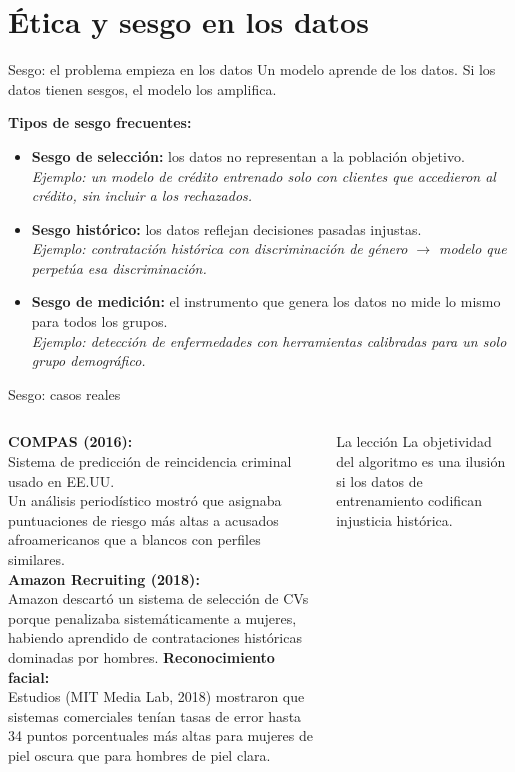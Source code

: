 \documentclass[aspectratio=169]{beamer}
\begin{document}
\section{Ética y sesgo en los datos}

\begin{frame}{Sesgo: el problema empieza en los datos}
  Un modelo aprende de los datos. Si los datos tienen sesgos, el modelo los amplifica.

  \bigskip
  \textbf{Tipos de sesgo frecuentes:}
  \begin{itemize}
    \item \textbf{Sesgo de selección:} los datos no representan a la población objetivo. \\
    \textit{Ejemplo: un modelo de crédito entrenado solo con clientes que accedieron al crédito, sin incluir a los rechazados.}
    \item \textbf{Sesgo histórico:} los datos reflejan decisiones pasadas injustas. \\
    \textit{Ejemplo: contratación histórica con discriminación de género $\rightarrow$ modelo que perpetúa esa discriminación.}
    \item \textbf{Sesgo de medición:} el instrumento que genera los datos no mide lo mismo para todos los grupos. \\
    \textit{Ejemplo: detección de enfermedades con herramientas calibradas para un solo grupo demográfico.}
  \end{itemize}
\end{frame}

\begin{frame}{Sesgo: casos reales}
  \begin{columns}
      \textbf{COMPAS (2016):}\\
      Sistema de predicción de reincidencia criminal usado en EE.UU.\\
      Un análisis periodístico mostró que asignaba puntuaciones de riesgo más altas a acusados afroamericanos que a blancos con perfiles similares.\\
      \bigskip
      \textbf{Amazon Recruiting (2018):}\\
      Amazon descartó un sistema de selección de CVs porque penalizaba sistemáticamente a mujeres, habiendo aprendido de contrataciones históricas dominadas por hombres.
      \textbf{Reconocimiento facial:}\\
      Estudios (MIT Media Lab, 2018) mostraron que sistemas comerciales tenían tasas de error hasta 34 puntos porcentuales más altas para mujeres de piel oscura que para hombres de piel clara.\\
      \bigskip
      \begin{alertblock}{La lección}
        La objetividad del algoritmo es una ilusión si los datos de entrenamiento codifican injusticia histórica.
      \end{alertblock}
  \end{columns}
\end{frame}
\end{document}
